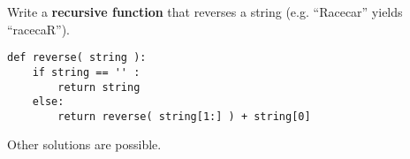 \label{reverse()} Write a \textbf{recursive function} that reverses a string (e.g. ``Racecar'' yields ``racecaR'').

\begin{answer}
\begin{lstlisting}
def reverse( string ):
    if string == '' :
        return string
    else:
        return reverse( string[1:] ) + string[0]
\end{lstlisting}
Other solutions are possible.
\end{answer}
